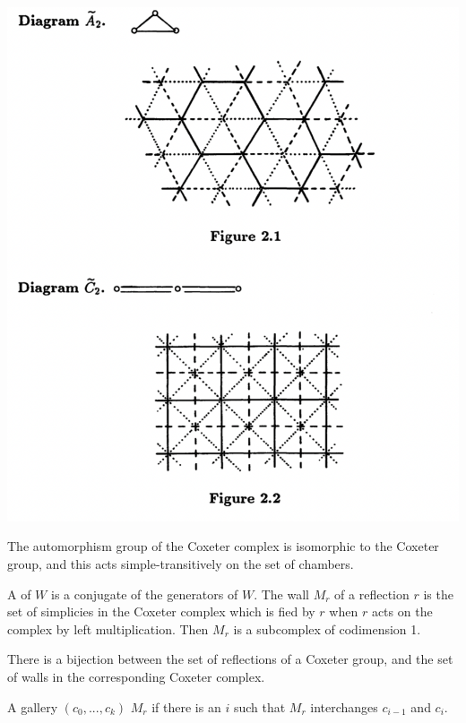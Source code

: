 \documentclass[11pt]{article}
\begin{document}
\includegraphics[scale=0.7]{Screenshot 2023-02-20 at 14.12.15.png}\\

\begin{lemma}
    The automorphism group of the Coxeter complex is isomorphic to the Coxeter group, and this acts simple-transitively on the set of chambers.
\end{lemma}

\begin{definition}
    A  of $W$ is a conjugate of the generators of $W$. The wall $M_r$ of a reflection $r$ is the set of simplicies in the Coxeter complex which is fied by $r$ when $r$ acts on the complex by left multiplication. Then $M_r$ is a subcomplex of codimension 1.
\end{definition}

\begin{theorem}
    There is a bijection between the set of reflections of a Coxeter group, and the set of walls in the corresponding Coxeter complex.
\end{theorem}

\begin{definition}
    A gallery $(c_0,...,c_k)$  $M_r$ if there is an $i$ such that $M_r$ interchanges $c_{i-1}$ and $c_i$. 
\end{definition}
\end{document}
